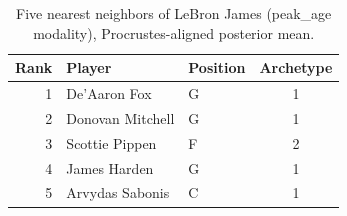 \begin{table}[htbp]
  \centering\small
  \begin{tabular}{rllc}
    \toprule
    Rank & Player & Position & Archetype \\
    \midrule
    1 & De'Aaron Fox & G & 1 \\
    2 & Donovan Mitchell & G & 1 \\
    3 & Scottie Pippen & F & 2 \\
    4 & James Harden & G & 1 \\
    5 & Arvydas Sabonis & C & 1 \\
    \bottomrule
  \end{tabular}
  \caption{Five nearest neighbors of LeBron James (peak_age modality), Procrustes-aligned posterior mean.}
  \label{tab:LeBron_James_neighbors_peak_age}
\end{table}

